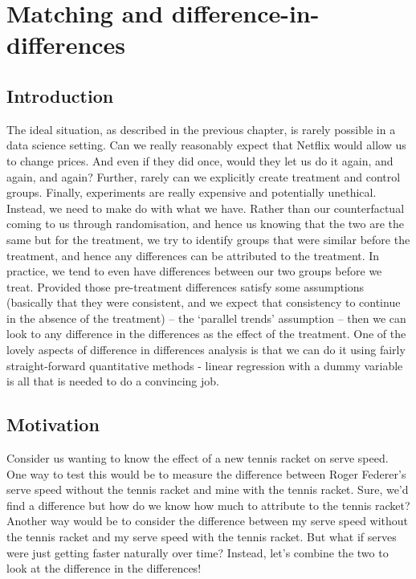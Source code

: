 \documentclass[
]{book}
\begin{document}
\hypertarget{matching-and-difference-in-differences}{%
\section{Matching and difference-in-differences}\label{matching-and-difference-in-differences}}

\hypertarget{introduction-20}{%
\subsection{Introduction}\label{introduction-20}}

The ideal situation, as described in the previous chapter, is rarely possible in a data science setting. Can we really reasonably expect that Netflix would allow us to change prices. And even if they did once, would they let us do it again, and again, and again? Further, rarely can we explicitly create treatment and control groups. Finally, experiments are really expensive and potentially unethical. Instead, we need to make do with what we have. Rather than our counterfactual coming to us through randomisation, and hence us knowing that the two are the same but for the treatment, we try to identify groups that were similar before the treatment, and hence any differences can be attributed to the treatment. In practice, we tend to even have differences between our two groups before we treat. Provided those pre-treatment differences satisfy some assumptions (basically that they were consistent, and we expect that consistency to continue in the absence of the treatment) -- the `parallel trends' assumption -- then we can look to any difference in the differences as the effect of the treatment. One of the lovely aspects of difference in differences analysis is that we can do it using fairly straight-forward quantitative methods - linear regression with a dummy variable is all that is needed to do a convincing job.

\hypertarget{motivation}{%
\subsection{Motivation}\label{motivation}}

Consider us wanting to know the effect of a new tennis racket on serve speed. One way to test this would be to measure the difference between Roger Federer's serve speed without the tennis racket and mine with the tennis racket. Sure, we'd find a difference but how do we know how much to attribute to the tennis racket? Another way would be to consider the difference between my serve speed without the tennis racket and my serve speed with the tennis racket. But what if serves were just getting faster naturally over time? Instead, let's combine the two to look at the difference in the differences!
\end{document}
